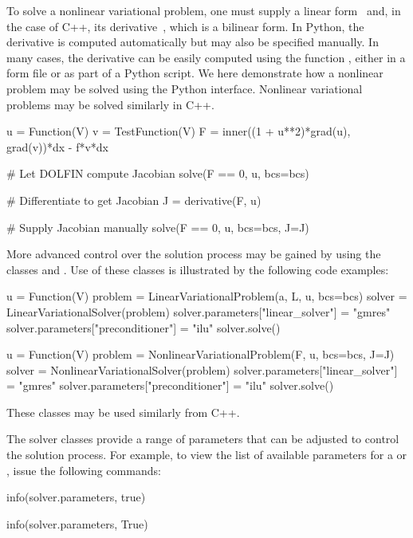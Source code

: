 To solve a nonlinear variational problem, one must supply a linear
form~ and, in the case of C++, its derivative~, which is
a bilinear form. In Python, the derivative is computed automatically
but may also be specified manually. In many cases, the derivative can
be easily computed using the function
, either in a  form file or as part of a Python
script. We here demonstrate how a nonlinear problem may be solved
using the Python interface. Nonlinear variational problems may be
solved similarly in C++.
%
\begin{python}
u  = Function(V)
v  = TestFunction(V)
F  = inner((1 + u**2)*grad(u), grad(v))*dx - f*v*dx

# Let DOLFIN compute Jacobian
solve(F == 0, u, bcs=bcs)

# Differentiate to get Jacobian
J = derivative(F, u)

# Supply Jacobian manually
solve(F == 0, u, bcs=bcs, J=J)
\end{python}


More advanced control over the solution process may be gained by
using the classes 
and . Use of these classes
is illustrated by the following code examples:
\pagebreak
%
\begin{python}
u = Function(V)
problem = LinearVariationalProblem(a, L, u, bcs=bcs)
solver = LinearVariationalSolver(problem)
solver.parameters["linear_solver"] = "gmres"
solver.parameters["preconditioner"] = "ilu"
solver.solve()
\end{python}
%
\begin{python}
u = Function(V)
problem = NonlinearVariationalProblem(F, u, bcs=bcs, J=J)
solver = NonlinearVariationalSolver(problem)
solver.parameters["linear_solver"] = "gmres"
solver.parameters["preconditioner"] = "ilu"
solver.solve()
\end{python}
These classes may be used similarly from C++.

The solver classes provide a range of parameters that can be adjusted
to control the solution process. For example, to view the list of
available parameters for a  or
, issue the following commands:
%
\begin{c++}
info(solver.parameters, true)
\end{c++}
%
\begin{python}
info(solver.parameters, True)
\end{python}

